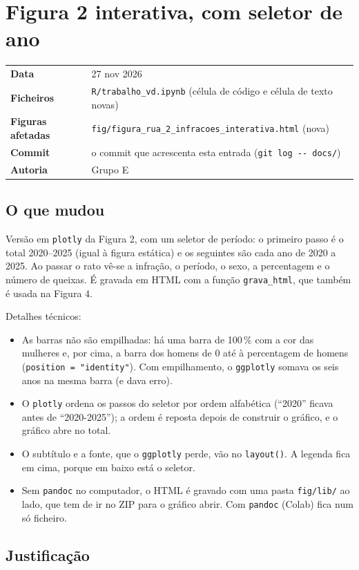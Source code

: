 \documentclass[11pt,a4paper]{article}
\makeatletter
\newcommand{\ficha}[5]{%
  \begin{center}
  \colorbox{fundo}{\begin{minipage}{0.95\linewidth}\small
  \begin{tabular}{@{}p{3.2cm}p{11.8cm}@{}}
  \textbf{Data} & #1\\
  \textbf{Ficheiros} & #2\\
  \textbf{Figuras afetadas} & #3\\
  \textbf{Commit} & #4\\
  \textbf{Autoria} & #5\\
  \end{tabular}
  \end{minipage}}
  \end{center}}
\makeatother
\begin{document}
\section{Figura 2 interativa, com seletor de ano}

\ficha{27 nov 2026}
      {\texttt{R/trabalho\_vd.ipynb} (célula de código e célula de texto novas)}
      {\texttt{fig/figura\_rua\_2\_infracoes\_interativa.html} (nova)}
      {o commit que acrescenta esta entrada (\texttt{git log -{}- docs/})}
      {Grupo E}

\subsection*{O que mudou}

Versão em \texttt{plotly} da Figura 2, com um seletor de período: o primeiro passo é o total
2020--2025 (igual à figura estática) e os seguintes são cada ano de 2020 a 2025. Ao passar o rato
vê-se a infração, o período, o sexo, a percentagem e o número de queixas. É gravada em HTML com a
função \texttt{grava\_html}, que também é usada na Figura 4.

Detalhes técnicos:
\begin{itemize}
  \item As barras não são empilhadas: há uma barra de 100\,\% com a cor das mulheres e, por cima,
        a barra dos homens de 0 até à percentagem de homens (\texttt{position = "identity"}). Com
        empilhamento, o \texttt{ggplotly} somava os seis anos na mesma barra (e dava erro).
  \item O \texttt{plotly} ordena os passos do seletor por ordem alfabética (``2020'' ficava antes de
        ``2020-2025''); a ordem é reposta depois de construir o gráfico, e o gráfico abre no total.
  \item O subtítulo e a fonte, que o \texttt{ggplotly} perde, vão no \texttt{layout()}. A legenda
        fica em cima, porque em baixo está o seletor.
  \item Sem \texttt{pandoc} no computador, o HTML é gravado com uma pasta \texttt{fig/lib/} ao lado,
        que tem de ir no ZIP para o gráfico abrir. Com \texttt{pandoc} (Colab) fica num só ficheiro.
\end{itemize}

\subsection*{Justificação}
\end{document}
